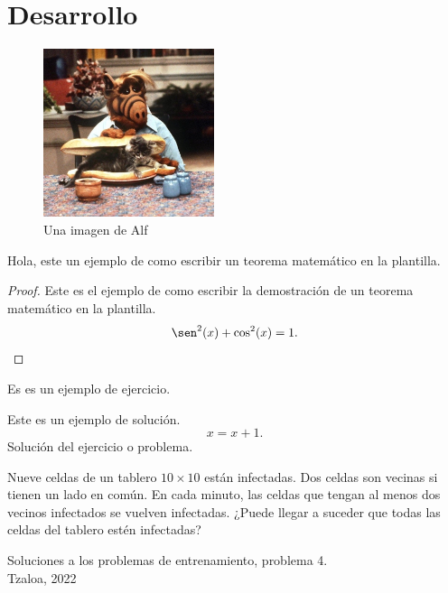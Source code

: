 \section{Desarrollo}

\begin{figure}[htb]
    \centering
    \includegraphics[width=5cm]{images/alf}
    \caption{Una imagen de Alf}
    \label{fig:figure}
\end{figure}

\begin{section-theorem}
    Hola, este un ejemplo de como escribir un teorema matemático en la plantilla.
\end{section-theorem}

\begin{proof}
    Este es el ejemplo de como escribir la demostración de un teorema matemático en la plantilla.
    \[
        \sen^2(x) + \cos^2(x) = 1. \qedhere
    \]
\end{proof}

\begin{section-exercise}
    Es es un ejemplo de ejercicio.
\end{section-exercise}

\begin{solution}
    Este es un ejemplo de solución.
    \[
        x = x + 1.
    \]
    Solución del ejercicio o problema.
\end{solution}


\begin{problem}
    Nueve celdas de un tablero $10\times10$ están infectadas. Dos celdas son vecinas si tienen un lado en común. En cada minuto, las celdas que tengan al menos dos vecinos infectados se vuelven infectadas. ¿Puede llegar a suceder que todas las celdas del tablero estén infectadas?

    \begin{source-problem}
        Soluciones a los problemas de entrenamiento, problema 4.\\ Tzaloa, 2022
    \end{source-problem}
\end{problem}

